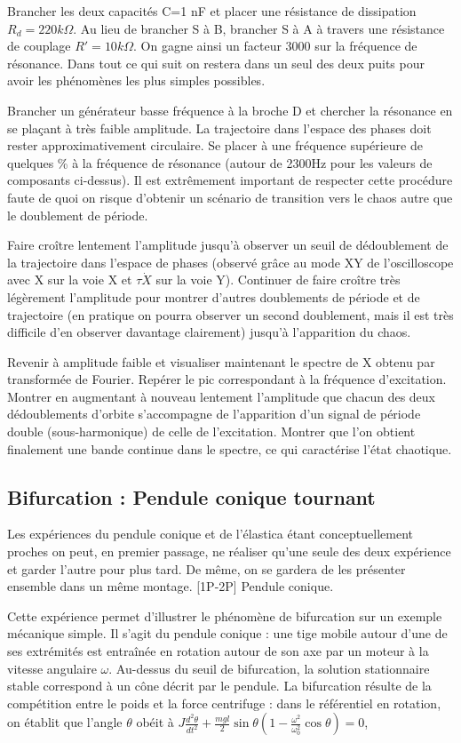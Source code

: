 \documentclass{article}%
\begin{document}
Brancher les deux capacités C=1\; nF et placer une résistance de dissipation $R_d= 220 k \Omega$. Au lieu de brancher S à B, brancher S à A à travers une résistance de couplage $R' = 10 k \Omega$. On gagne ainsi un facteur 3000 sur la fréquence de résonance. Dans tout ce qui suit on restera dans un seul des deux puits pour avoir les phénomènes les plus simples possibles.

Brancher un générateur basse fréquence à la broche D et chercher la résonance en se plaçant à très faible amplitude. La trajectoire dans l'espace des phases doit rester approximativement circulaire. Se placer à une fréquence supérieure de quelques \% à la fréquence de résonance (autour de 2300Hz pour les valeurs de composants ci-dessus). Il est extrêmement important de respecter cette procédure faute de quoi on risque d'obtenir un scénario de transition vers le chaos autre que le doublement de période.

Faire croître lentement l'amplitude jusqu'à observer un seuil de dédoublement de la trajectoire dans l'espace de phases (observé grâce au mode XY de l'oscilloscope avec X sur la voie X et $\tau \dot X$ sur la voie Y). Continuer de faire croître très légèrement l'amplitude pour montrer d'autres doublements de période et de trajectoire (en pratique on pourra observer un second doublement, mais il est très difficile d'en observer davantage clairement) jusqu'à l'apparition du chaos.

Revenir à amplitude faible et visualiser maintenant le spectre de X obtenu par transformée de Fourier. Repérer le pic correspondant à la fréquence d'excitation. Montrer en augmentant à nouveau lentement l'amplitude que chacun des deux dédoublements d'orbite s'accompagne de l'apparition d'un signal de période double (sous-harmonique) de celle de l'excitation. Montrer que l'on obtient finalement une bande continue dans le spectre, ce qui caractérise l'état chaotique.

\subsection{Bifurcation : Pendule conique tournant}

Les expériences du pendule conique et de l'élastica étant conceptuellement proches on peut, en premier passage, ne réaliser qu'une seule des deux expérience et garder l'autre pour plus tard. De même, on se gardera de les présenter ensemble dans un même montage.
[1P-2P] Pendule conique.

Cette expérience permet d'illustrer le phénomène de bifurcation sur un exemple mécanique simple. Il s'agit du pendule conique : une tige mobile autour d'une de ses extrémités est entraînée en rotation autour de son axe par un moteur à la vitesse angulaire $\omega$. Au-dessus du seuil de bifurcation, la solution stationnaire stable correspond à un cône décrit par le pendule. La bifurcation résulte de la compétition entre le poids et la force centrifuge : dans le référentiel en rotation, on établit que l'angle $\theta$ obéit à
$ J\frac{d^2\theta}{dt^2} + \frac{mgl}{2}\sin\theta \left( 1 - \frac{\omega^2}{\omega_0^2} \cos\theta \right) = 0$,
\end{document}
